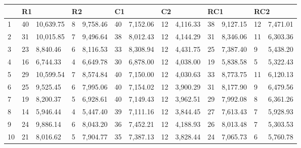 \begin{table}[caption={Best Results, 400 Locations}, label=tab:2]
    \begin{tabular}{lllllllllllll}
        \toprule
        & \multicolumn{2}{l}{R1} & \multicolumn{2}{l}{R2} & \multicolumn{2}{l}{C1} & \multicolumn{2}{l}{C2} & \multicolumn{2}{l}{RC1} & \multicolumn{2}{l}{RC2} \\
        \midrule
        1  & 40 & 10,639.75 & 8 & 9,758.46 & 40 & 7,152.06 & 12 & 4,116.33 & 38 & 9,127.15 & 12 & 7,471.01 \\
        2  & 31 & 10,015.85 & 7 & 9,496.64 & 38 & 8,012.43 & 12 & 4,144.29 & 31 & 8,346.06 & 11 & 6,303.36 \\
        3  & 23 & 8,840.46  & 6 & 8,116.53 & 33 & 8,308.94 & 12 & 4,431.75 & 25 & 7,387.40 & 9  & 5,438.20 \\
        4  & 16 & 6,744.33  & 4 & 6,649.78 & 30 & 6,878.00 & 12 & 4,038.00 & 19 & 5,838.58 & 5  & 5,322.43 \\
        5  & 29 & 10,599.54 & 7 & 8,574.84 & 40 & 7,150.00 & 12 & 4,030.63 & 33 & 8,773.75 & 11 & 6,120.13 \\
        6  & 25 & 9,525.45  & 6 & 7,995.06 & 40 & 7,154.02 & 12 & 3,900.29 & 31 & 8,177.90 & 9  & 6,479.56 \\
        7  & 19 & 8,200.37  & 5 & 6,928.61 & 40 & 7,149.43 & 12 & 3,962.51 & 29 & 7,992.08 & 8  & 6,361.26 \\
        8  & 14 & 5,946.44  & 4 & 5,447.40 & 39 & 7,111.16 & 12 & 3,844.45 & 27 & 7,613.43 & 7  & 5,928.93 \\
        9  & 24 & 9,886.14  & 6 & 8,043.20 & 36 & 7,452.21 & 12 & 4,188.93 & 26 & 8,013.48 & 7  & 5,303.53 \\
        10 & 21 & 8,016.62  & 5 & 7,904.77 & 35 & 7,387.13 & 12 & 3,828.44 & 24 & 7,065.73 & 6  & 5,760.78  \\
    \end{tabular} \\
\end{table}

